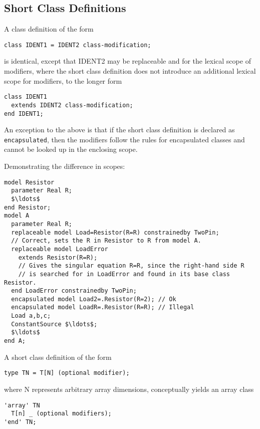 \subsection{Short Class Definitions}\label{short-class-definitions}

A class definition of the form
\begin{lstlisting}[language=modelica]
class IDENT1 = IDENT2 class-modification;
\end{lstlisting}

is identical, except that IDENT2 may be replaceable and for the lexical
scope of modifiers, where the short class definition does not introduce
an additional lexical scope for modifiers, to the longer form

\begin{lstlisting}[language=modelica]
class IDENT1
  extends IDENT2 class-modification;
end IDENT1;
\end{lstlisting}

An exception to the above is that if the short class definition is declared as \lstinline!encapsulated!, then the modifiers follow the rules for encapsulated classes and cannot be looked up in the enclosing scope.

\begin{example}
Demonstrating the difference in scopes:
\begin{lstlisting}[language=modelica]
model Resistor
  parameter Real R;
  $\ldots$
end Resistor;
model A
  parameter Real R;
  replaceable model Load=Resistor(R=R) constrainedby TwoPin;
  // Correct, sets the R in Resistor to R from model A.
  replaceable model LoadError
    extends Resistor(R=R);
    // Gives the singular equation R=R, since the right-hand side R
    // is searched for in LoadError and found in its base class Resistor.
  end LoadError constrainedby TwoPin;
  encapsulated model Load2=.Resistor(R=2); // Ok
  encapsulated model LoadR=.Resistor(R=R); // Illegal
  Load a,b,c;
  ConstantSource $\ldots$;
  $\ldots$
end A;
\end{lstlisting}
\end{example}

A short class definition of the form
\begin{lstlisting}[language=modelica]
type TN = T[N] (optional modifier);
\end{lstlisting}

where N represents arbitrary array dimensions, conceptually yields an
array class

\begin{lstlisting}[language=modelica]
'array' TN
  T[n] _ (optional modifiers);
'end' TN;
\end{lstlisting}

